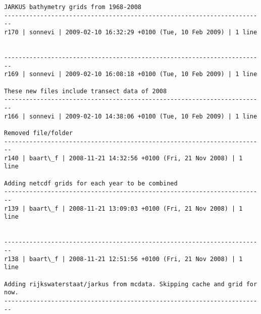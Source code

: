 \documentclass[9]{report}
\begin{document}
\begin{description}
\begin{verbatim}
JARKUS bathymetry grids from 1968-2008
------------------------------------------------------------------------
r170 | sonnevi | 2009-02-10 16:32:29 +0100 (Tue, 10 Feb 2009) | 1 line


------------------------------------------------------------------------
r169 | sonnevi | 2009-02-10 16:08:18 +0100 (Tue, 10 Feb 2009) | 1 line

These new files include transect data of 2008
------------------------------------------------------------------------
r166 | sonnevi | 2009-02-10 14:38:06 +0100 (Tue, 10 Feb 2009) | 1 line

Removed file/folder
------------------------------------------------------------------------
r140 | baart\_f | 2008-11-21 14:32:56 +0100 (Fri, 21 Nov 2008) | 1 line

Adding netcdf grids for each year to be combined
------------------------------------------------------------------------
r139 | baart\_f | 2008-11-21 13:09:03 +0100 (Fri, 21 Nov 2008) | 1 line


------------------------------------------------------------------------
r138 | baart\_f | 2008-11-21 12:51:56 +0100 (Fri, 21 Nov 2008) | 1 line

Adding rijkswaterstaat/jarkus from mcdata. Skipping cache and grid for now.
------------------------------------------------------------------------


\end{verbatim}
\end{description}
\end{document}
